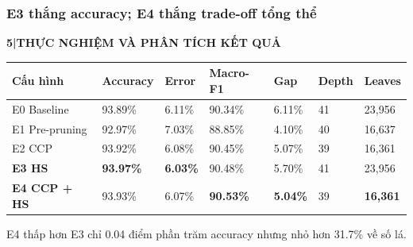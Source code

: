 \documentclass[aspectratio=169,12pt]{beamer}
\newcommand{\chaptertag}[2]{%
  \vspace{-0.16cm}%
  {\scriptsize\bfseries\textcolor{boxframe}{#1\enspace |\enspace #2}}\par
  \vspace{0.12cm}%
}
\begin{document}
\begin{frame}
  \frametitle{E3 thắng accuracy; E4 thắng trade-off tổng thể}
  \chaptertag{5}{THỰC NGHIỆM VÀ PHÂN TÍCH KẾT QUẢ}
  \scriptsize
  \begin{tabular}{@{}L{2.5cm}C{1.55cm}C{1.45cm}C{1.55cm}C{1.35cm}C{1.15cm}C{1.35cm}@{}}
    \toprule
    \textbf{Cấu hình} & \textbf{Accuracy} & \textbf{Error} & \textbf{Macro-F1} & \textbf{Gap} & \textbf{Depth} & \textbf{Leaves} \\
    \midrule
    E0 Baseline & 93.89\% & 6.11\% & 90.34\% & 6.11\% & 41 & 23,956 \\
    E1 Pre-pruning & 92.97\% & 7.03\% & 88.85\% & 4.10\% & 40 & 16,637 \\
    E2 CCP & 93.92\% & 6.08\% & 90.45\% & 5.07\% & 39 & 16,361 \\
    \textcolor{primaryblue}{\textbf{E3 HS}} & \textcolor{primaryblue}{\textbf{93.97\%}} & \textbf{6.03\%} & 90.48\% & 5.70\% & 41 & 23,956 \\
    \textcolor{boxframe}{\textbf{E4 CCP + HS}} & 93.93\% & 6.07\% & \textcolor{boxframe}{\textbf{90.53\%}} & \textcolor{boxframe}{\textbf{5.04\%}} & 39 & \textcolor{boxframe}{\textbf{16,361}} \\
    \bottomrule
  \end{tabular}
  \par\vspace{0.35cm}
  \begin{center}
    E4 thấp hơn E3 chỉ 0.04 điểm phần trăm accuracy nhưng nhỏ hơn 31.7\% về số lá.
  \end{center}
\end{frame}
\end{document}
